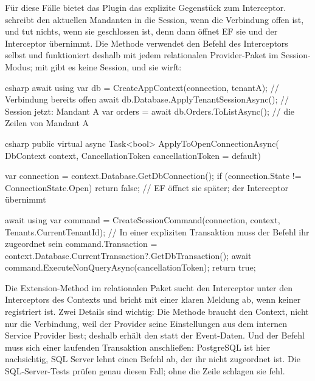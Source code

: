 Für diese Fälle bietet das Plugin das explizite Gegenstück zum Interceptor.
schreibt den aktuellen Mandanten in die Session, wenn die Verbindung offen ist, und tut
nichts, wenn sie geschlossen ist, denn dann öffnet EF sie und der Interceptor übernimmt. Die
Methode verwendet den Befehl des Interceptors selbst und funktioniert deshalb mit jedem
relationalen Provider-Paket im Session-Modus; mit
 gibt es keine Session, und
sie wirft:

\begin{sourcecode}[Verwendung]{csharp}
await using var db = CreateAppContext(connection, tenantA);   // Verbindung bereits offen
await db.Database.ApplyTenantSessionAsync();                  // Session jetzt: Mandant A
var orders = await db.Orders.ToListAsync();                   // die Zeilen von Mandant A
\end{sourcecode}

\begin{sourcecode}{csharp}
public virtual async Task<bool> ApplyToOpenConnectionAsync(
    DbContext context, CancellationToken cancellationToken = default)
{
    var connection = context.Database.GetDbConnection();
    if (connection.State != ConnectionState.Open)
        return false;                     // EF öffnet sie später; der Interceptor übernimmt

    await using var command =
        CreateSessionCommand(connection, context, Tenants.CurrentTenantId);
    // In einer expliziten Transaktion muss der Befehl ihr zugeordnet sein
    command.Transaction = context.Database.CurrentTransaction?.GetDbTransaction();
    await command.ExecuteNonQueryAsync(cancellationToken);
    return true;
}
\end{sourcecode}

Die Extension-Method  im relationalen Paket
sucht den Interceptor unter den Interceptors des Contexts und bricht mit einer klaren
Meldung ab, wenn keiner registriert ist. Zwei Details sind wichtig: Die Methode braucht den
Context, nicht nur die Verbindung, weil der Provider seine Einstellungen aus dem internen
Service Provider liest; deshalb erhält 
den  statt der Event-Daten. Und der Befehl muss sich einer
laufenden Transaktion anschließen: PostgreSQL ist hier nachsichtig, SQL Server lehnt einen
Befehl ab, der ihr nicht zugeordnet ist. Die SQL-Server-Tests prüfen genau diesen Fall; ohne
die Zeile schlagen sie fehl.

